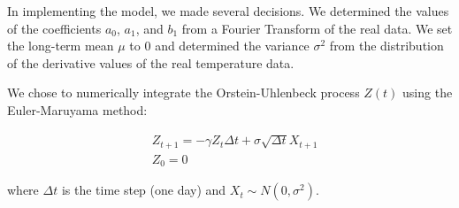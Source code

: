 \documentclass[11pt, letterpaper]{article}
\begin{document}
In implementing the model, we made several decisions.  We determined the values of the coefficients $a_0$, $a_1$, and $b_1$ from a Fourier Transform of the real data.  We set the long-term mean $\mu$ to 0 and determined the variance $\sigma^2$ from the distribution of the derivative values of the real temperature data.

We chose to numerically integrate the Orstein-Uhlenbeck process $Z(t)$ using the Euler-Maruyama method:

\begin{align}
&Z_{t+1} = - \gamma Z_t \Delta t + \sigma \sqrt{\Delta t} X_{t+1} \\
&Z_0 = 0
\end{align}

where $\Delta t$ is the time step (one day) and $X_t \sim N(0, \sigma^2)$.
\end{document}
